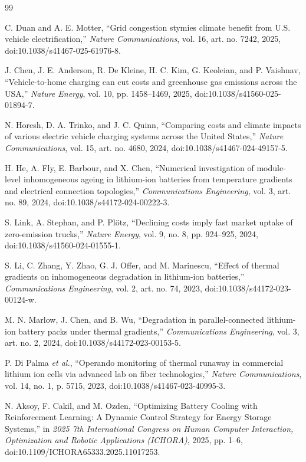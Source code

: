\documentclass[twocolumn]{article}
\begin{document}
\begin{thebibliography}{99}

C. Duan and A. E. Motter, ``Grid congestion stymies climate benefit from U.S. vehicle electrification,'' \textit{Nature Communications}, vol. 16, art. no. 7242, 2025, doi:10.1038/s41467-025-61976-8.

J. Chen, J. E. Anderson, R. De Kleine, H. C. Kim, G. Keoleian, and P. Vaishnav, ``Vehicle-to-home charging can cut costs and greenhouse gas emissions across the USA,'' \textit{Nature Energy}, vol. 10, pp. 1458--1469, 2025, doi:10.1038/s41560-025-01894-7.

N. Horesh, D. A. Trinko, and J. C. Quinn, ``Comparing costs and climate impacts of various electric vehicle charging systems across the United States,'' \textit{Nature Communications}, vol. 15, art. no. 4680, 2024, doi:10.1038/s41467-024-49157-5.

H. He, A. Fly, E. Barbour, and X. Chen, ``Numerical investigation of module-level inhomogeneous ageing in lithium-ion batteries from temperature gradients and electrical connection topologies,'' \textit{Communications Engineering}, vol. 3, art. no. 89, 2024, doi:10.1038/s44172-024-00222-3.

S. Link, A. Stephan, and P. Pl{\"o}tz, ``Declining costs imply fast market uptake of zero-emission trucks,'' \textit{Nature Energy}, vol. 9, no. 8, pp. 924--925, 2024, doi:10.1038/s41560-024-01555-1.

S. Li, C. Zhang, Y. Zhao, G. J. Offer, and M. Marinescu, ``Effect of thermal gradients on inhomogeneous degradation in lithium-ion batteries,'' \textit{Communications Engineering}, vol. 2, art. no. 74, 2023, doi:10.1038/s44172-023-00124-w.

M. N. Marlow, J. Chen, and B. Wu, ``Degradation in parallel-connected lithium-ion battery packs under thermal gradients,'' \textit{Communications Engineering}, vol. 3, art. no. 2, 2024, doi:10.1038/s44172-023-00153-5.

P. Di Palma \textit{et al.}, ``Operando monitoring of thermal runaway in commercial lithium ion cells via advanced lab on fiber technologies,'' \textit{Nature Communications}, vol. 14, no. 1, p. 5715, 2023, doi:10.1038/s41467-023-40995-3.

N. Aksoy, F. Cakil, and M. Ozden, ``Optimizing Battery Cooling with Reinforcement Learning: A Dynamic Control Strategy for Energy Storage Systems,'' in \textit{2025 7th International Congress on Human Computer Interaction, Optimization and Robotic Applications (ICHORA)}, 2025, pp. 1--6, doi:10.1109/ICHORA65333.2025.11017253.


\end{thebibliography}
\end{document}
